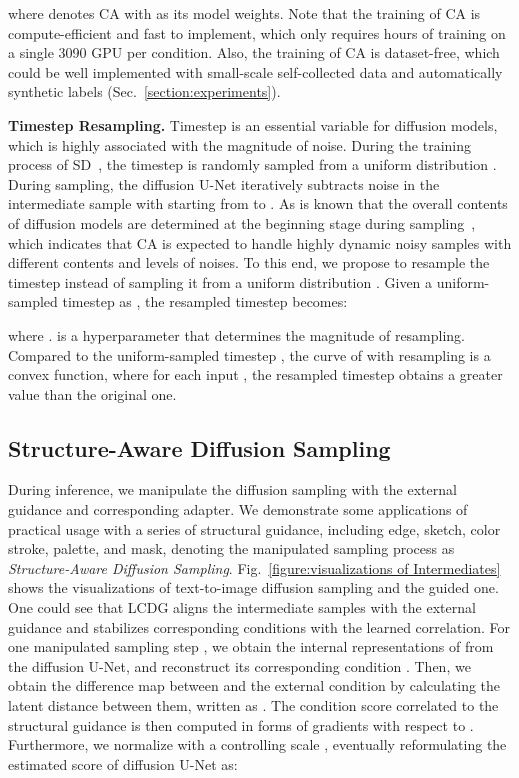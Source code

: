 \documentclass{article}
\begin{document}
where  denotes CA with  as its model weights. Note that the training of CA is compute-efficient and fast to implement, which only requires hours of training on a single 3090 GPU per condition. Also, the training of CA is dataset-free, which could be well implemented with small-scale self-collected data and automatically synthetic labels (Sec.~\ref{section:experiments}).


\textbf{Timestep Resampling.} Timestep is an essential variable for diffusion models, which is highly associated with the magnitude of noise. During the training process of SD~\cite{rombach2022high}, the timestep  is randomly sampled from a uniform distribution . During sampling, the diffusion U-Net iteratively subtracts noise in the intermediate sample  with  starting from  to . As is known that the overall contents of diffusion models are determined at the beginning stage during sampling~\cite{mou2023t2i}, which indicates that CA is expected to handle highly dynamic noisy samples  with different contents and levels of noises. To this end, we propose to resample the timestep  instead of sampling it from a uniform distribution . Given a uniform-sampled timestep as , the resampled timestep  becomes:

where .  is a hyperparameter that determines the magnitude of resampling. Compared to the uniform-sampled timestep , the curve of  with resampling is a convex function, where for each input , the resampled timestep obtains a greater value than the original one.



\subsection{Structure-Aware Diffusion Sampling}
During inference, we manipulate the diffusion sampling with the external guidance and corresponding adapter. We demonstrate some applications of practical usage with a series of structural guidance, including edge, sketch, color stroke, palette, and mask, denoting the manipulated sampling process as \textit{Structure-Aware Diffusion Sampling}. Fig.~\ref{figure:visualizations of Intermediates} shows the visualizations of text-to-image diffusion sampling and the guided one. One could see that LCDG aligns the intermediate samples with the external guidance and stabilizes corresponding conditions with the learned correlation. For one manipulated sampling step , we obtain the internal representations of  from the diffusion U-Net, and reconstruct its corresponding condition . Then, we obtain the difference map between  and the external condition  by calculating the latent distance between them, written as . The condition score  correlated to the structural guidance is then computed in forms of gradients with respect to . Furthermore, we normalize  with a controlling scale , eventually reformulating the estimated score  of diffusion U-Net as:
\end{document}
